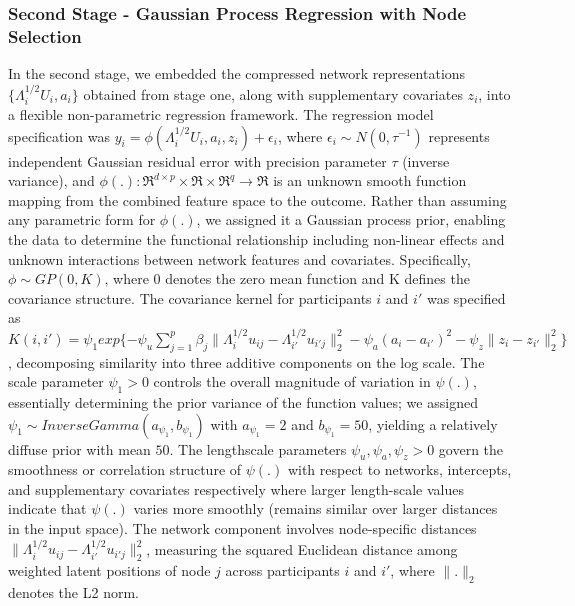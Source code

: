 \documentclass[pdflatex,article,12pt]{article}
\begin{document}
\subsubsection{Second Stage - Gaussian Process Regression with Node Selection}
In the second stage, we embedded the compressed network representations $\{\Lambda_i^{1/2} U_i, a_i\}$ obtained from stage one, along with supplementary covariates $z_i$, into a flexible non-parametric regression framework. The regression model specification was $y_i = \phi(\Lambda_i^{1/2} U_i, a_i, z_i) + \epsilon_i$, where $\epsilon_i \sim N(0, \tau^{-1})$ represents independent Gaussian residual error with precision parameter $\tau$ (inverse variance), and $\phi(.): \Re^{d\times p} \times \Re \times \Re^q \rightarrow \Re$ is an unknown smooth function mapping from the combined feature space to the outcome. Rather than assuming any parametric form for $\phi(.)$, we assigned it a Gaussian process prior, enabling the data to determine the functional relationship including non-linear effects and unknown interactions between network features and covariates. Specifically, $\phi \sim GP(0, K)$, where 0 denotes the zero mean function and K defines the covariance structure. The covariance kernel for participants $i$ and $i'$ was specified as $K(i,i') = \psi_1 exp\{-\psi_u \sum_{j=1}^p \beta_j \|\Lambda_i^{1/2} u_{ij} - \Lambda_{i'}^{1/2} u_{i'j}\|_2^2 - \psi_a(a_i - a_{i'})^2 - \psi_z\|z_i - z_{i'}\|_2^2\}$, decomposing similarity into three additive components on the log scale. The scale parameter $\psi_1 > 0$ controls the overall magnitude of variation in $\psi(.)$, essentially determining the prior variance of the function values; we assigned $\psi_1 \sim InverseGamma(a_{\psi_1}, b_{\psi_1})$ with $a_{\psi_1} = 2$ and $b_{\psi_1} = 50$, yielding a relatively diffuse prior with mean $50$. The lengthscale parameters $\psi_u, \psi_a, \psi_z > 0$ govern the smoothness or correlation structure of $\psi(.)$ with respect to networks, intercepts, and supplementary covariates respectively where larger length-scale values indicate that $\psi(.)$ varies more smoothly (remains similar over larger distances in the input space). The network component involves node-specific distances $\|\Lambda_i^{1/2} u_{ij} - \Lambda_{i'}^{1/2} u_{i'j}\|_2^2$, measuring the squared Euclidean distance among weighted latent positions of node $j$ across participants $i$ and $i'$, where $\|.\|_2$ denotes the L2 norm. 
\end{document}
